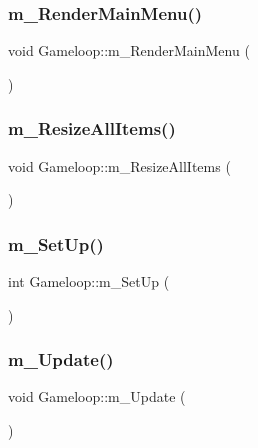\subsubsection{\texorpdfstring{m\+\_\+\+Render\+Main\+Menu()}{m\_RenderMainMenu()}}
{\footnotesize\ttfamily void Gameloop\+::m\+\_\+\+Render\+Main\+Menu (\begin{DoxyParamCaption}{ }\end{DoxyParamCaption})}

\mbox{\label{class_gameloop_af8b85224ff509ae981a1d02b9dff7fa6}} 
\subsubsection{\texorpdfstring{m\+\_\+\+Resize\+All\+Items()}{m\_ResizeAllItems()}}
{\footnotesize\ttfamily void Gameloop\+::m\+\_\+\+Resize\+All\+Items (\begin{DoxyParamCaption}{ }\end{DoxyParamCaption})}

\mbox{\label{class_gameloop_ad295af6c73c59dac924e98443c83e926}} 
\subsubsection{\texorpdfstring{m\+\_\+\+Set\+Up()}{m\_SetUp()}}
{\footnotesize\ttfamily int Gameloop\+::m\+\_\+\+Set\+Up (\begin{DoxyParamCaption}{ }\end{DoxyParamCaption})}

\mbox{\label{class_gameloop_aec0cdc82daf752449dcd50839df2a0ba}} 
\subsubsection{\texorpdfstring{m\+\_\+\+Update()}{m\_Update()}}
{\footnotesize\ttfamily void Gameloop\+::m\+\_\+\+Update (\begin{DoxyParamCaption}{ }\end{DoxyParamCaption})}

